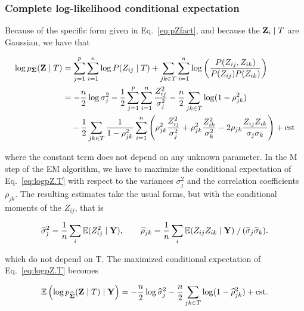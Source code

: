 \subsubsection*{Complete log-likelihood conditional expectation}
Because of the specific form given in Eq.~\eqref{eq:pZfact}, and because the ${\bf Z}_i\mid T$  are Gaussian, we have that
 
\begin{align}
    \label{eq:logpZ.T}
    \log{p_{\boldsymbol{\Sigma}}}({\bf Z} \mid T)
    & = \sum_{j=1}^p \sum_{i=1}^n \log P(Z_{ij} \mid T) 
    + \sum_{jk \in T} \sum_{i=1}^n \log \left(\frac{P(Z_{ij}, Z_{ik})}{P(Z_{ij})P(Z_{ik})}\right) \nonumber \\
    & = - \frac{n}2 \log \sigma_j^2 -\frac12 \sum_{j=1}^p \sum_{i=1}^n \frac{Z_{ij}^2}{\sigma_j^2}
    - \frac{n}2 \sum_{jk \in T} \log (1- \rho_{jk}^2) \\
    & \quad - \frac12 \sum_{jk \in T} \frac1{1- \rho_{jk}^2} \sum_{i=1}^n \left(
    \rho^2_{jk} \frac{Z_{ij}^2}{\sigma_j^2} + \rho^2_{jk} \frac{Z_{ik}^2}{\sigma_k^2} - 2\rho_{jk} \frac{Z_{ij} Z_{ik}}{\sigma_j \sigma_k}
    \right)
    + \text{cst} \nonumber 
\end{align}
 

where the constant term does not depend on any unknown parameter. 
In the M step of the EM algorithm, we have to maximize the conditional expectation of Eq.~\eqref{eq:logpZ.T} with respect to the variances $\sigma_j^2$ and the correlation coefficients $\rho_{jk}$. The resulting estimates take the usual forms, but with the conditional moments of the $Z_{ij}$, that is
 
\begin{equation} \label{eq:sigma.rho}
\widehat{\sigma}_j^2  = \frac1n \sum_i \operatorname*{\mathbb{E}}(Z^2_{ij}  \mid  {\bf Y}),
\qquad
\widehat{\rho}_{jk}   = \frac1n \sum_i \operatorname*{\mathbb{E}}(Z_{ij} Z_{ik}  \mid  {\bf Y})\left. \right/ (\widehat{\sigma}_j \widehat{\sigma}_k)  .
\end{equation}
 
which do not depend on T. 
The maximized conditional expectation of Eq.~\eqref{eq:logpZ.T} becomes
 
\begin{equation} \label{eq:ElogpZ.T.Y}
    \operatorname*{\mathbb{E}}\left(\log p_{\widehat{{\boldsymbol{\Sigma}}}}({\bf Z} \mid T) \mid {\bf Y}\right)
    = - \frac{n}2 \log \widehat{\sigma}_j^2 
    - \frac{n}2 \sum_{jk \in T} \log (1- \widehat{\rho}_{jk}^2)
    + \text{cst}.
\end{equation}
 
